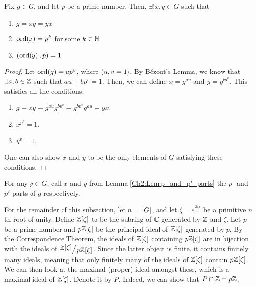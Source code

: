 
\begin{lemma} \label{Ch2:Lem:p_and_p'_parts}
    Fix $g \in G$, and let $p$ be a prime number. Then, $\exists! x, y \in G$ such that
    \begin{enumerate}[label= \normalfont \arabic*., noitemsep]
        \item $g = xy = yx$
        \item $\operatorname{ord}\!\left( x \right) = p^k$ for some $k \in \mathbb{N}$
        \item $\left( \operatorname{ord}\!\left( y \right), p \right) = 1$
    \end{enumerate}
\end{lemma}
\begin{proof}
    Let $\operatorname{ord}\!\left( g \right) = u p^v$, where $\left( u,v = 1 \right)$. By Bézout's Lemma, we know that $\exists a, b \in \mathbb{Z}$ such that $au + bp^v = 1$. %
    Then, we can define $x = g^{au}$ and $y = g^{bp^v}$. This satisfies all the conditions:
    \begin{enumerate}
        \item $g = xy = g^{au} g^{bp^v} = g^{bp^v} g^{au} = yx$.
        \item $x^{p^v} = 1$. %
        \item $y^v = 1$.    %
    \end{enumerate}
    One can also show $x$ and $y$ to be the only elements of $G$ satisfying these conditions. %
\end{proof}

\begin{boxdefinition}
    For any $g \in G$, call $x$ and $y$ from Lemma \ref{Ch2:Lem:p_and_p'_parts} the $p$- and $p'$-parts of $g$ respectively.
\end{boxdefinition}

For the remainder of this subsection, let $n$ = $\left\lvert G \right\rvert$, and let $\zeta = e^{\frac{2\pi i}{n}}$ be a primitive $n$th root of unity. Define $\mathbb{Z}[\zeta]$ to be the subring of $\mathbb{C}$ generated by $\mathbb{Z}$ and $\zeta$. Let $p$ be a prime number and $p\mathbb{Z}[\zeta]$ be the principal ideal of $\mathbb{Z}[\zeta]$ generated by $p$. By the Correspondence Theorem, the ideals of $\mathbb{Z}[\zeta]$ containing $p\mathbb{Z}[\zeta]$ are in bijection with the ideals of $\quotient{\Z[\zeta]}{p\Z[\zeta]}$. Since the latter object is finite, it contains finitely many ideals, meaning that only finitely many of the ideals of $\mathbb{Z}[\zeta]$ contain $p\mathbb{Z}[\zeta]$. We can then look at the maximal (proper) ideal amongst these, which is a maximal ideal of $\mathbb{Z}[\zeta]$. Denote it by $P$. Indeed, we can show that $P \cap \mathbb{Z} = p\mathbb{Z}$.

